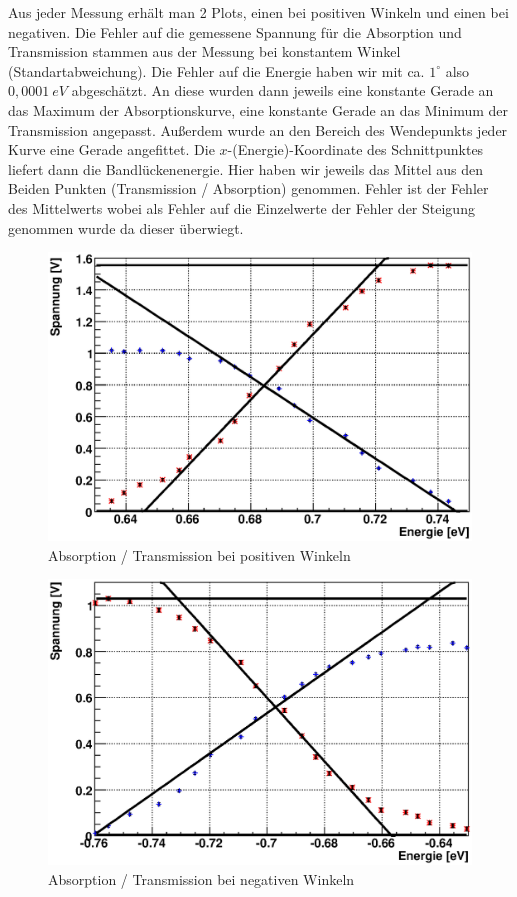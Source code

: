 \documentclass[12pt]{article}
\begin{document}
Aus jeder Messung erhält man 2 Plots, einen bei positiven Winkeln und einen bei negativen. Die Fehler auf die gemessene Spannung für die Absorption und Transmission stammen aus der Messung bei konstantem Winkel (Standartabweichung). Die Fehler auf die Energie haben wir mit ca. $1^\circ$ also $0,0001~eV$ abgeschätzt. An diese wurden dann jeweils eine konstante Gerade an das Maximum der Absorptionskurve, eine konstante Gerade an das Minimum der Transmission angepasst. Außerdem wurde an den Bereich des Wendepunkts jeder Kurve eine Gerade angefittet. Die $x$-(Energie)-Koordinate des Schnittpunktes liefert dann die Bandlückenenergie. Hier haben wir jeweils das Mittel aus den Beiden Punkten (Transmission / Absorption) genommen. Fehler ist der Fehler des Mittelwerts wobei als Fehler auf die Einzelwerte der Fehler der Steigung genommen wurde da dieser überwiegt. \\
\begin{figure}[H]  
\centering
\includegraphics[width=0.9\linewidth]{pictures/bandluecke/grge1.eps}
\caption{Absorption / Transmission bei positiven Winkeln}
\end{figure}

\begin{figure}[H]  
\centering
\includegraphics[width=0.9\linewidth]{pictures/bandluecke/grge1b.eps}
\caption{Absorption / Transmission bei negativen Winkeln}
\end{figure}
\end{document}
